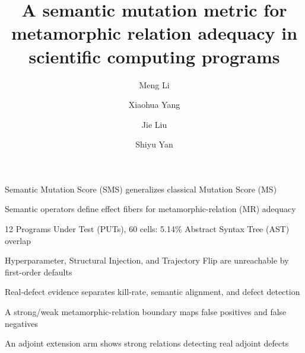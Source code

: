 \documentclass[review,12pt,authoryear]{elsarticle}
\begin{document}
\begin{frontmatter}

\title{A semantic mutation metric for metamorphic relation adequacy in scientific computing programs}

\author[a,b,c]{Meng Li}
\author[a,b,c]{Xiaohua Yang}
\author[a,b,c]{Jie Liu}
\author[a,b,c]{Shiyu Yan}



\begin{highlights}
\item Semantic Mutation Score (SMS) generalizes classical Mutation Score (MS)
\item Semantic operators define effect fibers for metamorphic-relation (MR) adequacy
\item 12 Programs Under Test (PUTs), 60 cells: 5.14\% Abstract Syntax Tree (AST) overlap
\item Hyperparameter, Structural Injection, and Trajectory Flip are unreachable by first-order defaults
\item Real-defect evidence separates kill-rate, semantic alignment, and defect detection
\item A strong/weak metamorphic-relation boundary maps false positives and false negatives
\item An adjoint extension arm shows strong relations detecting real adjoint defects
\end{highlights}


\end{frontmatter}
\end{document}
